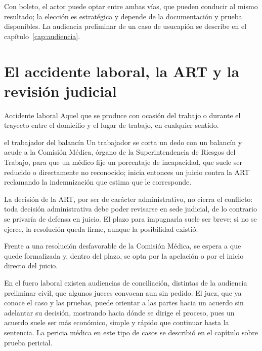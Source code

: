 \documentclass[12pt,oneside]{book}
\begin{document}
Con boleto, el actor puede optar entre ambas vías, que pueden conducir al mismo resultado; la elección es estratégica y depende de la documentación y prueba disponibles. La audiencia preliminar de un caso de usucapión se describe en el capítulo~\ref{cap:audiencia}.

\section{El accidente laboral, la ART y la revisión judicial}

\begin{definicion}{Accidente laboral}
Aquel que se produce con ocasión del trabajo o durante el trayecto entre el domicilio y el lugar de trabajo, en cualquier sentido.
\end{definicion}

\begin{ejemplo}{el trabajador del balancín}
Un trabajador se corta un dedo con un balancín y acude a la Comisión Médica, órgano de la Superintendencia de Riesgos del Trabajo, para que un médico fije un porcentaje de incapacidad, que suele ser reducido o directamente no reconocido; inicia entonces un juicio contra la ART reclamando la indemnización que estima que le corresponde.
\end{ejemplo}

\begin{importante}
La decisión de la ART, por ser de carácter administrativo, no cierra el conflicto: toda decisión administrativa debe poder revisarse en sede judicial, de lo contrario se privaría de defensa en juicio. El plazo para impugnarla suele ser breve; si no se ejerce, la resolución queda firme, aunque la posibilidad existió.
\end{importante}

Frente a una resolución desfavorable de la Comisión Médica, se espera a que quede formalizada y, dentro del plazo, se opta por la apelación o por el inicio directo del juicio.

En el fuero laboral existen audiencias de conciliación, distintas de la audiencia preliminar civil, que algunos jueces convocan aun sin pedido. El juez, que ya conoce el caso y las pruebas, puede orientar a las partes hacia un acuerdo sin adelantar su decisión, mostrando hacia dónde se dirige el proceso, pues un acuerdo suele ser más económico, simple y rápido que continuar hasta la sentencia. La pericia médica en este tipo de casos se describió en el capítulo sobre prueba pericial.
\end{document}
